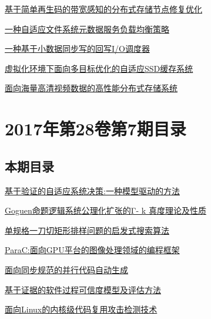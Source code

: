 \documentclass[a4paper]{article}
\begin{document}
\href{http://www.jos.org.cn/ch/reader/create_pdf.aspx?file_no=5204&year_id=2017&quarter_id=8&falg=1}{基于简单再生码的带宽感知的分布式存储节点修复优化}

\href{http://www.jos.org.cn/ch/reader/create_pdf.aspx?file_no=5199&year_id=2017&quarter_id=8&falg=1}{一种自适应文件系统元数据服务负载均衡策略}

\href{http://www.jos.org.cn/ch/reader/create_pdf.aspx?file_no=5202&year_id=2017&quarter_id=8&falg=1}{一种基于小数据同步写的回写I/O调度器}

\href{http://www.jos.org.cn/ch/reader/create_pdf.aspx?file_no=5201&year_id=2017&quarter_id=8&falg=1}{虚拟化环境下面向多目标优化的自适应SSD缓存系统}

\href{http://www.jos.org.cn/ch/reader/create_pdf.aspx?file_no=5203&year_id=2017&quarter_id=8&falg=1}{面向海量高清视频数据的高性能分布式存储系统}


\section{\textbf{2017年第28卷第7期目录}}
\subsection{本期目录}
\href{http://www.jos.org.cn/ch/reader/create_pdf.aspx?file_no=5257&year_id=2017&quarter_id=7&falg=1}{基于验证的自适应系统决策:一种模型驱动的方法}

\href{http://www.jos.org.cn/ch/reader/create_pdf.aspx?file_no=5110&year_id=2017&quarter_id=7&falg=1}{Goguen命题逻辑系统公理化扩张的Γ- k 真度理论及性质}

\href{http://www.jos.org.cn/ch/reader/create_pdf.aspx?file_no=5100&year_id=2017&quarter_id=7&falg=1}{单规格一刀切矩形排样问题的启发式搜索算法}

\href{http://www.jos.org.cn/ch/reader/create_pdf.aspx?file_no=5241&year_id=2017&quarter_id=7&falg=1}{ParaC:面向GPU平台的图像处理领域的编程框架}

\href{http://www.jos.org.cn/ch/reader/create_pdf.aspx?file_no=5056&year_id=2017&quarter_id=7&falg=1}{面向同步规范的并行代码自动生成}

\href{http://www.jos.org.cn/ch/reader/create_pdf.aspx?file_no=5102&year_id=2017&quarter_id=7&falg=1}{基于证据的软件过程可信度模型及评估方法}

\href{http://www.jos.org.cn/ch/reader/create_pdf.aspx?file_no=5058&year_id=2017&quarter_id=7&falg=1}{面向Linux的内核级代码复用攻击检测技术}
\end{document}
